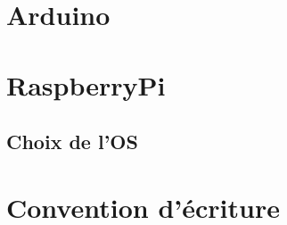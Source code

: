 \section{Arduino}

\section{RaspberryPi}

\subsection{Choix de l'OS}

\section{Convention d'écriture}
